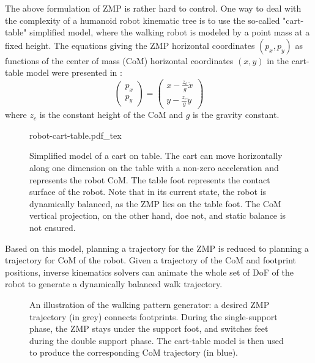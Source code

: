 The above formulation of ZMP is rather hard to control.  One way to
deal with the complexity of a humanoid robot kinematic tree is to use
the so-called "cart-table" simplified model, where the walking robot
is modeled by a point mass at a fixed height.  The equations giving
the ZMP horizontal coordinates $(p_x,p_y)$ as functions of the center
of mass (CoM) horizontal coordinates $(x,y)$ in the cart-table model
were presented in \cite{kaji03}:
\begin{equation}
\label{eq:chap1-walk-zmp}
\left(
\begin{array}{c}
p_x\\ p_y
\end{array}
\right) = \displaystyle \left(
\begin{array}{c}
x - \frac{z_c}{g} \ddot{x}\\ y - \frac{z_c}{g} \ddot{y}
\end{array}
\right)
\end{equation}
where $z_c$ is the constant height of the CoM and $g$ is the gravity
constant.

\begin{figure}
  \centering
      {\def\svgwidth{0.5\linewidth}
        
                   {robot-cart-table.pdf_tex}}
      \caption{Simplified model of a cart on table. The cart can move
        horizontally along one dimension on the table with a non-zero
        acceleration and represents the robot CoM. The table foot
        represents the contact surface of the robot. Note that in its
        current state, the robot is dynamically balanced, as the ZMP
        lies on the table foot. The CoM vertical projection, on the
        other hand, doe not, and static balance is not ensured.}
      \label{fig:chap1-robot-cart-table}
\end{figure}

Based on this model, planning a trajectory for the ZMP is reduced to
planning a trajectory for CoM of the robot. Given a trajectory of the
CoM and footprint positions, inverse kinematics solvers can animate
the whole set of DoF of the robot to generate a dynamically balanced
walk trajectory.

\begin{figure}
  \centering
  
  \caption{An illustration of the walking pattern generator: a desired
    ZMP trajectory (in grey) connects footprints. During the
    single-support phase, the ZMP stays under the support foot, and
    switches feet during the double support phase. The cart-table
    model is then used to produce the corresponding CoM trajectory (in
    blue).}
  \label{fig:chap1-zmp}
\end{figure}

